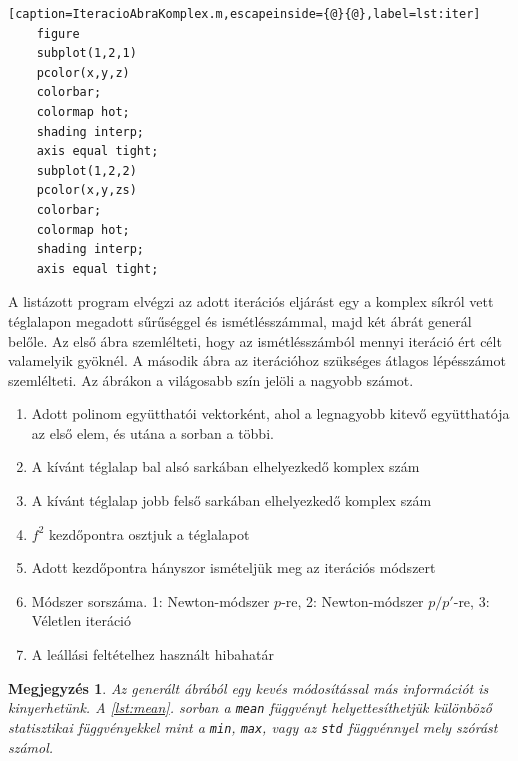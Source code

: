 \documentclass[a4paper,12pt]{report}
\newtheorem{Megj}[Tet]{Megjegyzés}
\begin{document}
\begin{appendices}
\begin{singlespace}
\begin{lstlisting}[caption=IteracioAbraKomplex.m,escapeinside={@}{@},label=lst:iter]
    figure                                                                  
    subplot(1,2,1)                                                          
    pcolor(x,y,z)                                                           
    colorbar;                                                               
    colormap hot;                                                           
    shading interp;                                                         
    axis equal tight;                                                       
    subplot(1,2,2)                                                          
    pcolor(x,y,zs)                                                          
    colorbar;                                                               
    colormap hot;                                                           
    shading interp;                                                         
    axis equal tight;
			\end{lstlisting}
            \end{singlespace}
			A listázott program elvégzi az adott iterációs eljárást egy a komplex síkról vett téglalapon megadott sűrűséggel és ismétlésszámmal, majd két ábrát generál belőle. Az első ábra szemlélteti, hogy az ismétlésszámból mennyi iteráció ért célt valamelyik gyöknél. A második ábra az iterációhoz szükséges átlagos lépésszámot szemlélteti. Az ábrákon a világosabb szín jelöli a nagyobb számot.
			\begin{enumerate}
				\item[p:] Adott polinom együtthatói vektorként, ahol a legnagyobb kitevő együtthatója az első elem, és utána a sorban a többi.
				\item[a:] A kívánt téglalap bal alsó sarkában elhelyezkedő komplex szám
				\item[b:] A kívánt téglalap jobb felső sarkában elhelyezkedő komplex szám
				\item[f:] $f^2$ kezdőpontra osztjuk a téglalapot
				\item[ism:] Adott kezdőpontra hányszor ismételjük meg az iterációs módszert
				\item[m:] Módszer sorszáma. 1: Newton-módszer $p$-re, 2: Newton-módszer $p/p'$-re, 3: Véletlen iteráció
				\item[h:] A leállási feltételhez használt hibahatár
			\end{enumerate}
			\begin{Megj}\label{app:megj}
				Az generált ábrából egy kevés módosítással más információt is kinyerhetünk. A \ref{lst:mean}. sorban a \texttt{mean} függvényt helyettesíthetjük különböző statisztikai függvényekkel mint a \texttt{min}, \texttt{max}, vagy az \texttt{std} függvénnyel mely szórást számol.

\end{Megj}
\end{appendices}
\end{document}
